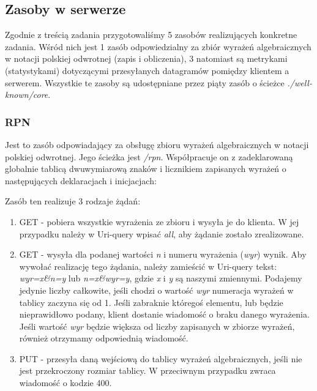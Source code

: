 \subsection{Zasoby w serwerze}

Zgodnie z treścią zadania przygotowaliśmy 5 zasobów realizujących konkretne zadania. Wśród nich jest 1 zasób odpowiedzialny za zbiór wyrażeń algebraicznych w notacji polskiej odwrotnej (zapis i obliczenia), 3 natomiast są metrykami (statystykami) dotyczącymi przesyłanych datagramów pomiędzy klientem a serwerem. Wszystkie te zasoby są udostępniane przez piąty zasób o ścieżce \textit{./well-known/core}.

\subsubsection{RPN}

Jest to zasób odpowiadający za obsługę zbioru wyrażeń algebraicznych w notacji polskiej odwrotnej. Jego ścieżka jest \textit{/rpn}. Współpracuje on z zadeklarowaną globalnie tablicą dwuwymiarową znaków i licznikiem zapisanych wyrażeń o następujących deklaracjach i inicjacjach:

\vspace{0.5cm}

\vspace{0.5cm}

Zasób ten realizuje 3 rodzaje żądań:
\begin{enumerate}
    \item GET - pobiera wszystkie wyrażenia ze zbioru i wysyła je do klienta. W jej przypadku należy w Uri-query wpisać \textit{all}, aby żądanie zostało zrealizowane.
    \item GET - wysyła dla podanej wartości \textit{n} i numeru wyrażenia (\textit{wyr}) wynik. Aby wywołać realizację tego żądania, należy zamieścić w Uri-query tekst: \textit{wyr=x\&n=y} lub \textit{n=x\&wyr=y}, gdzie \textit{x} i \textit{y} są naszymi zmiennymi. Podajemy jedynie liczby całkowite, jeśli chodzi o wartość \textit{wyr} numeracja wyrażeń w tablicy zaczyna się od 1. Jeśli zabraknie któregoś elementu, lub będzie nieprawidłowo podany, klient dostanie wiadomość o braku danego wyrażenia. Jeśli wartość \textit{wyr} będzie większa od liczby zapisanych w zbiorze wyrażeń, również otrzymamy odpowiednią wiadomość.
    \item PUT - przesyła daną wejściową do tablicy wyrażeń algebraicznych, jeśli nie jest przekroczony rozmiar tablicy. W przeciwnym przypadku zwraca wiadomość o kodzie 400. 
\end{enumerate}

